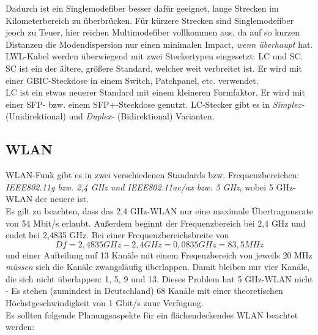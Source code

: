 \documentclass[a4paper, 12pt]{report}
\begin{document}
\begin{multicols}{2}
Dadurch ist ein Singlemodefiber besser dafür geeignet, lange Strecken im
Kilometerbereich zu überbrücken. Für kürzere Strecken sind Singlemodefiber jeoch
zu Teuer, hier reichen Multimodefiber vollkommen aus, da auf so kurzen Distanzen
die Modendispersion nur einen minimalen Impact, \emph{wenn überhaupt} hat. \\

LWL-Kabel werden überwiegend mit zwei Steckertypen eingesetzt: LC und SC. \\

SC ist ein der ältere, größere Standard, welcher weit verbreitet ist. Er wird
mit einer GBIC-Steckdose in einem Switch, Patchpanel, etc. verwendet. \\

LC ist ein etwas neuerer Standard mit einem kleineren Formfaktor. Er wird
mit einer SFP- bzw. einem SFP+-Steckdose genutzt. LC-Stecker gibt es in
\emph{Simplex-} (Unidirektional) und \emph{Duplex-} (Bidirektional) Varianten.

\subsection{WLAN}

WLAN-Funk gibt es in zwei verschiedenen Standards bzw. Frequenzbereichen:
\emph{IEEE802.11g bzw. 2,4 GHz und IEEE802.11ac/ax bzw. 5 GHz}, wobei 5 GHz-WLAN
der neuere ist. \\

Es gilt zu beachten, dass das 2,4 GHz-WLAN nur eine maximale Übertragunsrate von
54 Mbit/s erlaubt. Außerdem beginnt der Frequenzbereich bei 2,4 GHz und endet
bei 2,4835 GHz. Bei einer Frequenzbereichsbreite von $$Df = 2,4835 GHz - 2,4
GHz = 0,0835 GHz = 83,5 MHz$$ und einer Aufteilung auf 13 Kanäle mit einem
Freqenzbereich von jeweils 20 MHz \emph{müssen} sich die Kanäle zwangsläufig
überlappen. Damit bleiben nur vier Kanäle, die sich nicht überlappen: 1, 5, 9
und 13. Dieses Problem hat 5 GHz-WLAN nicht - Es stehen (zumindest in
Deutschland) 68 Kanäle mit einer theoretischen Höchstgeschwindigkeit von
1 Gbit/s zuur Verfügung. \\

Es sollten folgende Planungsaspekte für ein flächendeckendes WLAN beachtet
werden:


\end{multicols}
\end{document}

